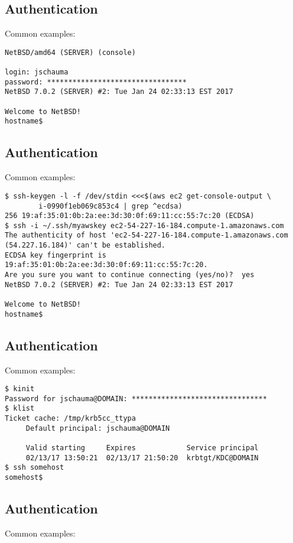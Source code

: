 \documentclass[xga]{xdvislides}
\begin{document}
\subsection{Authentication}
Common examples:

\begin{verbatim}
NetBSD/amd64 (SERVER) (console)

login: jschauma
password: *********************************
NetBSD 7.0.2 (SERVER) #2: Tue Jan 24 02:33:13 EST 2017

Welcome to NetBSD!
hostname$ 
\end{verbatim}

\subsection{Authentication}
Common examples:

\begin{verbatim}
$ ssh-keygen -l -f /dev/stdin <<<$(aws ec2 get-console-output \
        i-0990f1eb069c853c4 | grep ^ecdsa)
256 19:af:35:01:0b:2a:ee:3d:30:0f:69:11:cc:55:7c:20 (ECDSA)
$ ssh -i ~/.ssh/myawskey ec2-54-227-16-184.compute-1.amazonaws.com
The authenticity of host 'ec2-54-227-16-184.compute-1.amazonaws.com
(54.227.16.184)' can't be established.
ECDSA key fingerprint is 19:af:35:01:0b:2a:ee:3d:30:0f:69:11:cc:55:7c:20.
Are you sure you want to continue connecting (yes/no)?  yes
NetBSD 7.0.2 (SERVER) #2: Tue Jan 24 02:33:13 EST 2017

Welcome to NetBSD!
hostname$ 
\end{verbatim}

\subsection{Authentication}
Common examples:

\begin{verbatim}
$ kinit
Password for jschauma@DOMAIN: ********************************
$ klist
Ticket cache: /tmp/krb5cc_ttypa
     Default principal: jschauma@DOMAIN
     
     Valid starting     Expires            Service principal
     02/13/17 13:50:21  02/13/17 21:50:20  krbtgt/KDC@DOMAIN
$ ssh somehost
somehost$ 
\end{verbatim}

\subsection{Authentication}
Common examples:
\end{document}
